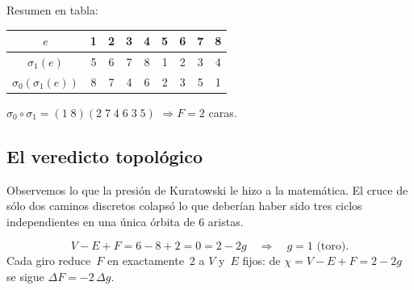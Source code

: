 \documentclass[11pt, a4paper, openany]{book}
\begin{document}
\medskip
\noindent
Resumen en tabla:
\begin{center}
\renewcommand{\arraystretch}{1.15}
\begin{tabular}{c@{\;\;}c@{\;\;}c@{\;\;}c@{\;\;}c@{\;\;}c@{\;\;}c@{\;\;}c@{\;\;}c}
\toprule
$e$ & 1 & 2 & 3 & 4 & 5 & 6 & 7 & 8 \\
\midrule
$\sigma_1(e)$ & 5 & 6 & 7 & 8 & 1 & 2 & 3 & 4 \\
$\sigma_0(\sigma_1(e))$ & 8 & 7 & 4 & 6 & 2 & 3 & 5 & 1 \\
\bottomrule
\end{tabular}
\end{center}
$\sigma_0 \circ \sigma_1 = (1\;8)(2\;7\;4\;6\;3\;5)$
\quad$\Longrightarrow$\quad $F = 2$ caras.

\subsection{El veredicto topológico}

Observemos lo que la presión de Kuratowski le hizo a la matemática.
El cruce de sólo dos caminos discretos colapsó lo que deberían haber
sido tres ciclos independientes en una única órbita de 6 aristas.

\[
  V - E + F = 6 - 8 + 2 = 0 = 2 - 2g
  \quad\Longrightarrow\quad \boxed{g = 1} \text{ (toro).}
\]
Cada giro reduce~$F$ en exactamente~2 a $V$ y~$E$ fijos: de
$\chi = V - E + F = 2 - 2g$ se sigue $\Delta F = -2\,\Delta g$.
\end{document}
